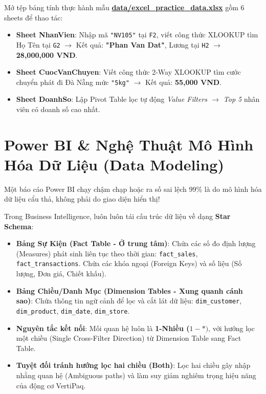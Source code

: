 \begin{handsonlabbox}
Mở tệp bảng tính thực hành mẫu \href{run:./data/excel_practice_data.xlsx}{\textbf{data/excel\_practice\_data.xlsx}} gồm 6 sheets để thao tác:
\begin{itemize}
    \item \textbf{Sheet NhanVien}: Nhập mã \texttt{"NV105"} tại \texttt{F2}, viết công thức XLOOKUP tìm Họ Tên tại \texttt{G2} $\rightarrow$ Kết quả: \textbf{"Phan Van Dat"}, Lương tại \texttt{H2} $\rightarrow$ \textbf{28,000,000 VND}.
    \item \textbf{Sheet CuocVanChuyen}: Viết công thức 2-Way XLOOKUP tìm cước chuyển phát đi Đà Nẵng mức \texttt{"5kg"} $\rightarrow$ Kết quả: \textbf{55,000 VND}.
    \item \textbf{Sheet DoanhSo}: Lập Pivot Table lọc tự động \textit{Value Filters $\rightarrow$ Top 5} nhân viên có doanh số cao nhất.
\end{itemize}
\end{handsonlabbox}

\section{Power BI \& Nghệ Thuật Mô Hình Hóa Dữ Liệu (Data Modeling)}

Một báo cáo Power BI chạy chậm chạp hoặc ra số sai lệch 99\% là do mô hình hóa dữ liệu cẩu thả, không phải do giao diện hiển thị!

\begin{lythuyetbox}
Trong Business Intelligence, luôn luôn tái cấu trúc dữ liệu về dạng \textbf{Star Schema}:
\begin{itemize}
    \item \textbf{Bảng Sự Kiện (Fact Table - Ở trung tâm)}: Chứa các số đo định lượng (Measures) phát sinh liên tục theo thời gian: \texttt{fact\_sales}, \texttt{fact\_transactions}. Chứa các khóa ngoại (Foreign Keys) và số liệu (Số lượng, Đơn giá, Chiết khấu).
    \item \textbf{Bảng Chiều/Danh Mục (Dimension Tables - Xung quanh cánh sao)}: Chứa thông tin ngữ cảnh để lọc và cắt lát dữ liệu: \texttt{dim\_customer}, \texttt{dim\_product}, \texttt{dim\_date}, \texttt{dim\_store}.
    \item \textbf{Nguyên tắc kết nối}: Mối quan hệ luôn là \textbf{1-Nhiều ($1 - *)$}, với hướng lọc một chiều (Single Cross-Filter Direction) từ Dimension Table sang Fact Table.
    \item \textbf{Tuyệt đối tránh hướng lọc hai chiều (Both)}: Lọc hai chiều gây nhập nhằng quan hệ (Ambiguous paths) và làm suy giảm nghiêm trọng hiệu năng của động cơ VertiPaq.
\end{itemize}
\end{lythuyetbox}

